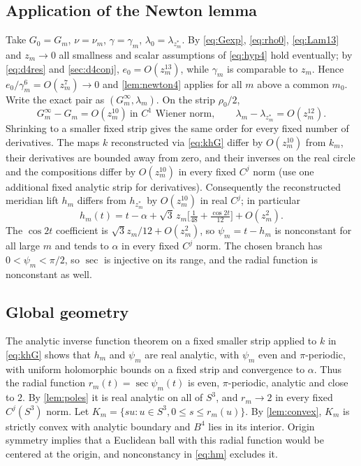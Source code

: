 \documentclass[11pt]{amsart}
\numberwithin{equation}{section}
\theoremstyle{definition}
\theoremstyle{remark}
\begin{document}
\subsection{Application of the Newton lemma}
Take $G_0=G_m$, $\nu=\nu_m$, $\gamma=\gamma_m$, $\lambda_0=\lambda_{z_m^*}$. By \eqref{eq:Gexp}, \eqref{eq:rho0}, \eqref{eq:Lam13} and $z_m\to0$ all smallness and scalar assumptions of \eqref{eq:hyp4} hold eventually; by \eqref{eq:d4res} and \cref{sec:d4conj}, $e_0=O(z_m^{13})$, while $\gamma_m$ is comparable to $z_m$. Hence $e_0/\gamma_m^6=O(z_m^7)\to0$ and \cref{lem:newton4} applies for all $m$ above a common $m_0$. Write the exact pair as $(G_m^\infty,\lambda_m)$. On the strip $\rho_0/2$,
\begin{equation}\label{eq:11-1}
G_m^\infty-G_m=O(z_m^{10})\ \text{in $C^1$ Wiener norm},\qquad\lambda_m-\lambda_{z_m^*}=O(z_m^{12}).
\end{equation}
Shrinking to a smaller fixed strip gives the same order for every fixed number of derivatives. The maps $k$ reconstructed via \eqref{eq:khG} differ by $O(z_m^{10})$ from $k_m$, their derivatives are bounded away from zero, and their inverses on the real circle and the compositions differ by $O(z_m^{10})$ in every fixed $C^j$ norm (use one additional fixed analytic strip for derivatives). Consequently the reconstructed meridian lift $h_m$ differs from $h_{z_m^*}$ by $O(z_m^{10})$ in real $C^j$; in particular
\begin{equation}\label{eq:hm}
h_m(t)=t-\alpha+\sqrt3\,z_m\bigl[\tfrac1{48}+\tfrac{\cos2t}{12}\bigr]+O(z_m^2).
\end{equation}
The $\cos2t$ coefficient is $\sqrt3z_m/12+O(z_m^2)$, so $\psi_m=t-h_m$ is nonconstant for all large $m$ and tends to $\alpha$ in every fixed $C^j$ norm. The chosen branch has $0<\psi_m<\pi/2$, so $\sec$ is injective on its range, and the radial function is nonconstant as well.

\subsection{Global geometry}
The analytic inverse function theorem on a fixed smaller strip applied to $k$ in \eqref{eq:khG} shows that $h_m$ and $\psi_m$ are real analytic, with $\psi_m$ even and $\pi$-periodic, with uniform holomorphic bounds on a fixed strip and convergence to $\alpha$. Thus the radial function $r_m(t)=\sec\psi_m(t)$ is even, $\pi$-periodic, analytic and close to $2$. By \cref{lem:poles} it is real analytic on all of $S^3$, and $r_m\to2$ in every fixed $C^j(S^3)$ norm. Let $K_m=\{su:u\in S^3,0\le s\le r_m(u)\}$. By \cref{lem:convex}, $K_m$ is strictly convex with analytic boundary and $B^4$ lies in its interior. Origin symmetry implies that a Euclidean ball with this radial function would be centered at the origin, and nonconstancy in \eqref{eq:hm} excludes it.
\end{document}
